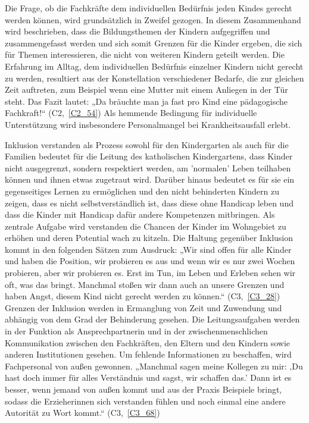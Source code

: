 Die Frage, ob die Fachkräfte dem individuellen Bedürfnis jeden Kindes gerecht werden können, wird grundsätzlich in Zweifel gezogen. In diesem Zusammenhand wird beschrieben, dass die Bildungsthemen der Kindern aufgegriffen und zusammengefasst werden und sich somit Grenzen für die Kinder ergeben, die sich für Themen interessieren, die nicht von weiteren Kindern geteilt werden. Die Erfahrung im Alltag, dem individuellen Bedürfnis einzelner Kindern nicht gerecht zu werden, resultiert aus der Konstellation verschiedener Bedarfe, die zur gleichen Zeit auftreten, zum Beispiel wenn eine Mutter mit einem Anliegen in der Tür steht. Das Fazit lautet: „Da bräuchte man ja fast pro Kind eine pädagogische Fachkraft!“ (C2,~\ref{C2_54}) 
Als hemmende Bedingung für individuelle Unterstützung wird insbesondere Personalmangel bei Krankheitsausfall erlebt.

Inklusion verstanden als Prozess sowohl für den Kindergarten als auch für die Familien bedeutet für die Leitung des katholischen Kindergartens, dass Kinder nicht ausgegrenzt, sondern respektiert werden, am 'normalen' Leben teilhaben können und ihnen etwas zugetraut wird. Darüber hinaus bedeutet es für sie ein gegenseitiges Lernen zu ermöglichen und den nicht behinderten Kindern zu zeigen, dass es nicht selbstverständlich ist, dass diese ohne Handicap leben und dass die Kinder mit Handicap dafür andere Kompetenzen mitbringen. Als zentrale Aufgabe wird verstanden die Chancen der Kinder im Wohngebiet zu erhöhen und deren Potential wach zu kitzeln.
Die Haltung gegenüber Inklusion kommt in den folgenden Sätzen zum Ausdruck: „Wir sind offen für alle Kinder und haben die Position, wir probieren es aus und wenn wir es nur zwei Wochen probieren, aber wir probieren es. Erst im Tun, im Leben und Erleben sehen wir oft, was das bringt. Manchmal stoßen wir dann auch an unsere Grenzen und haben Angst, diesem Kind nicht gerecht werden zu können.“ (C3,~\ref{C3_28}) Grenzen der Inklusion werden in Ermanglung von Zeit und Zuwendung und abhängig von dem Grad der Behinderung gesehen.  
Die Leitungsaufgaben werden in der Funktion als Ansprechpartnerin und in der zwischenmenschlichen Kommunikation zwischen den Fachkräften, den Eltern und den Kindern sowie anderen Institutionen gesehen. Um fehlende Informationen zu beschaffen, wird Fachpersonal von außen gewonnen.
„Manchmal sagen meine Kollegen zu mir: ‚Du hast doch immer für alles Verständnis und sagst, wir schaffen das.’ Dann ist es besser, wenn jemand von außen kommt und aus der Praxis Beispiele bringt, sodass die Erzieherinnen sich verstanden fühlen und noch einmal eine andere Autorität zu Wort kommt.“ (C3,~\ref{C3_68}) 

